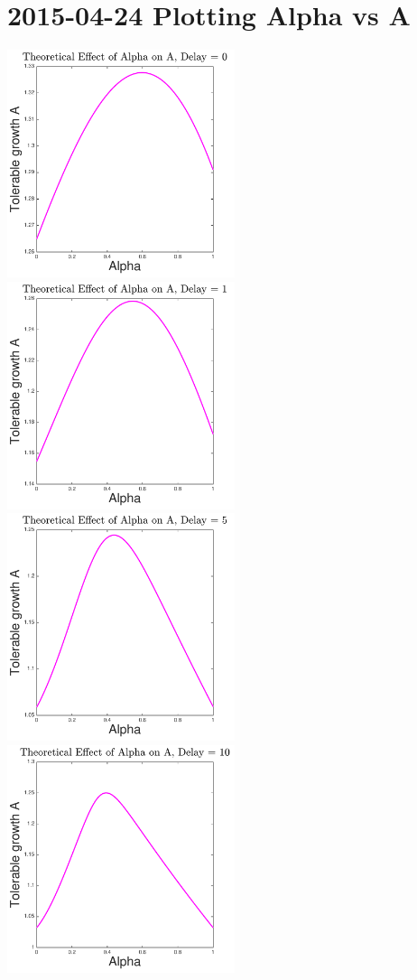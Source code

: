 \documentclass[leqno,twocolumn]{article}
\begin{document}
\section{2015-04-24 Plotting Alpha vs A}
\includegraphics[width=0.5\textwidth]{150424_alphvsa_d0}
\includegraphics[width=0.5\textwidth]{150424_alphvsa_d1}\\
\includegraphics[width=0.5\textwidth]{150424_alphvsa_d5}
\includegraphics[width=0.5\textwidth]{150424_alphvsa_d10}\\
\end{document}
